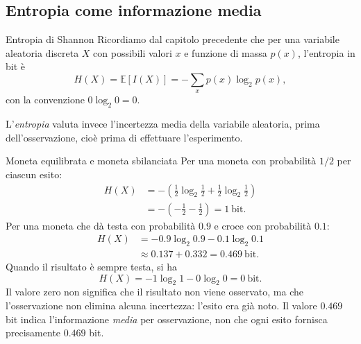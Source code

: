 \subsection{Entropia come informazione media}

\begin{definition}{Entropia di Shannon}
Ricordiamo dal capitolo precedente che per una variabile aleatoria discreta $X$ con possibili valori $x$ e funzione di massa $p(x)$, l'entropia in bit è
\begin{equation}
H(X)=\mathbb{E}[I(X)]=-\sum_{x}p(x)\log_2 p(x),
\end{equation}
con la convenzione $0\log_2 0=0$.
\end{definition}

L'\emph{entropia} valuta invece l'incertezza media della variabile aleatoria, prima dell'osservazione, cioè prima di effettuare l'esperimento.

\begin{example}{Moneta equilibrata e moneta sbilanciata}
Per una moneta con probabilità $1/2$ per ciascun esito:
\begin{align}
H(X)&=-\left(\tfrac12\log_2\tfrac12+\tfrac12\log_2\tfrac12\right)\\
&=-\left(-\tfrac12-\tfrac12\right)=1\ \text{bit}.
\end{align}
Per una moneta che dà testa con probabilità $0.9$ e croce con probabilità $0.1$:
\begin{align}
H(X)&=-0.9\log_2 0.9-0.1\log_2 0.1\\
&\approx 0.137+0.332=0.469\ \text{bit}.
\end{align}
Quando il risultato è sempre testa, si ha
\begin{equation}
H(X)=-1\log_2 1-0\log_2 0=0\ \text{bit}.
\end{equation}
Il valore zero non significa che il risultato non viene osservato, ma che l'osservazione non elimina alcuna incertezza: l'esito era già noto. Il valore $0.469$ bit indica l'informazione \emph{media} per osservazione, non che ogni esito fornisca precisamente $0.469$ bit.
\end{example}

